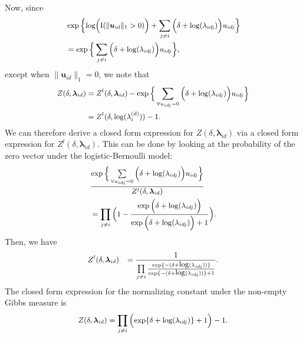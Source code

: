 \documentclass[twoside]{article}
\begin{document}
  	 Now, since 
  	 \begin{equation*}
  	   	 \footnotesize
  	 \begin{aligned}
  	 &\exp\Big\{ \mbox{log}\Big(\text{I}(\lVert \boldsymbol{u}_{id} \rVert_1 > 0)\Big) + \sum_{j \neq i} \Big(\delta+\mbox{log}(\lambda_{idj})\Big)u_{idj} \Big\}\\&= \exp\Big\{  \sum_{j \neq i} \Big(\delta+\mbox{log}(\lambda_{idj})\Big)u_{idj} \Big\},
\end{aligned}
 	 \end{equation*}
 	  except when $\lVert \boldsymbol{u}_{id} \rVert_1=0$, we note that 
  	 \begin{equation*}
  	   	 \footnotesize
  	 \begin{aligned}
  	 Z(\delta,\boldsymbol{\lambda}_{id})& = Z^{l}(\delta,\boldsymbol{\lambda}_{id}) -  \exp\Big\{ \sum\limits_{\forall u_{idj}=0}\Big(\delta+\log(\lambda_{idj})\Big)u_{idj} \Big\}
  	 \\& = Z^{l}(\delta,\mbox{log}(\lambda_{i}^{(d)})) -  1.
  	 \end{aligned}
  	 \end{equation*}
  	 We can therefore derive a closed form expression for $Z(\delta,\boldsymbol{\lambda}_{id})$ via a closed form expression for $Z^{l}(\delta,\boldsymbol{\lambda}_{id})$. This can be done by looking at the probability of the zero vector under the logistic-Bernoulli model:
  	 \begin{equation*}
  	 \footnotesize
  	 \begin{aligned}
  	 &\frac{\exp\Big\{ \sum\limits_{\forall u_{idj}=0}\Big(\delta+\log(\lambda_{idj})\Big)u_{idj} \Big\}}{Z^{l}(\delta,\boldsymbol{\lambda}_{id})}\\&= \prod_{j \neq i}   \Big(1-\frac{ \exp{\Big(\delta+\log(\lambda_{idj})\Big)}}{\exp{\Big(\delta+\log(\lambda_{idj})\Big)} + 1}\Big).
  	  \end{aligned}  
  	  \end{equation*}
  	  Then, we have 
  	    	 \begin{equation*}
  	    	   	 \footnotesize
  	    	 \begin{aligned}
  	& Z^{l}(\delta,\boldsymbol{\lambda}_{id}) &= \frac{1}{\prod\limits_{j \neq i}   \frac{ \exp\{-(\delta+\mbox{log}(\lambda_{idj}))\}}{\exp\{-(\delta+\mbox{log}(\lambda_{idj}))\} + 1}}.
  	 \end{aligned}  
  	 \end{equation*}
  	 The closed form expression for the normalizing constant under the non-empty Gibbs measure is  \begin{equation*}
  	   	 \footnotesize
  	 \begin{aligned}Z(\delta,\boldsymbol{\lambda}_{id}) = \prod_{j \neq i } \Big(\mbox{exp}\{\delta+\mbox{log}(\lambda_{idj})\} + 1\Big)-1.
  	 \end{aligned}  
  	 \end{equation*}
  	
\end{document}
